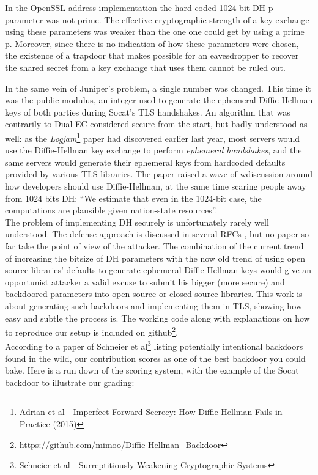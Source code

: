 \documentclass[a4paper,11pt,twocolumn]{article}
\begin{document}
\begin{displayquote}
In the OpenSSL address implementation the hard coded 1024 bit DH p parameter was not prime. The effective cryptographic strength of a key exchange using these parameters was weaker than the one one could get by using a prime p. Moreover, since there is no indication of how these parameters were chosen, the existence of a trapdoor that makes possible for an eavesdropper to recover the shared secret from a key exchange that uses them cannot be ruled out.
\end{displayquote}

In the same vein of Juniper's problem, a single number was changed. This time it was the public modulus, an integer used to generate the ephemeral Diffie-Hellman keys of both parties during Socat's TLS handshakes. An algorithm that was contrarily to Dual-EC considered secure from the start, but badly understood as well: as the \emph{Logjam}\footnote{Adrian et al - Imperfect Forward Secrecy: How Diffie-Hellman Fails in Practice (2015)}\cite{logjam} paper had discovered earlier last year, most servers would use the Diffie-Hellman key exchange to perform \emph{ephemeral handshakes}, and the same servers would generate their ephemeral keys from hardcoded defaults provided by various TLS libraries. The paper raised a wave of wdiscussion around how developers should use Diffie-Hellman, at the same time scaring people away from 1024 bits DH: ``We estimate that even in the 1024-bit case, the computations are plausible given nation-state resources''.\\

The problem of implementing DH securely is unfortunately rarely well understood. The defense approach is discussed in several RFCs \cite{rfc2631} \cite{rfc2785}, but no paper so far take the point of view of the attacker. The combination of the current trend of increasing the bitsize of DH parameters with the now old trend of using open source libraries' defaults to generate ephemeral Diffie-Hellman keys would give an opportunist attacker a valid excuse to submit his bigger (more secure) and backdoored parameters into open-source or closed-source libraries. This work is about generating such backdoors and implementing them in TLS, showing how easy and subtle the process is. The working code along with explanations on how to reproduce our setup is included on github\footnote{\url{https://github.com/mimoo/Diffie-Hellman_Backdoor}}.\\

According to a paper of Schneier et al\footnote{Schneier et al - Surreptitiously Weakening Cryptographic Systems}\cite{surreptitiously} listing potentially intentional backdoors found in the wild, our contribution scores as one of the best backdoor you could bake. Here is a run down of the scoring system, with the example of the Socat backdoor to illustrate our grading:
\end{document}
